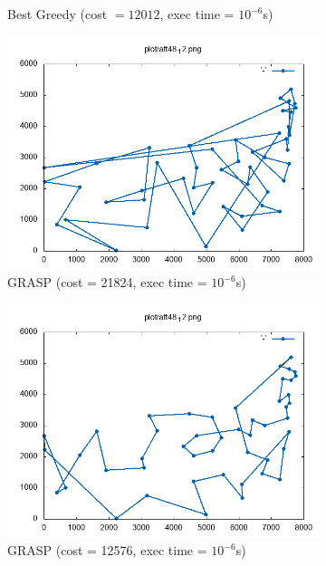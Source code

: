 \begin{figure}[!h]
\begin{subfigure}{.5\textwidth}
		\caption{Best Greedy (cost $ = 12012 $, exec time = $ 10^{-6} $s)}
		\label{fig:att48_GREEDY}
	\end{subfigure}
	\begin{subfigure}{.5\textwidth}
	\centering
	\includegraphics[width=\columnwidth]{../res/att48_12_1.png}
	\caption{GRASP (cost = 21824, exec time = $ 10^{-6} $s)}
	\label{fig:att48_GRASP1}
	\end{subfigure}
	\begin{subfigure}{.5\textwidth}
	\centering
	\includegraphics[width=\columnwidth]{../res/att48_12_2.png}
	\caption{GRASP (cost = 12576, exec time = $ 10^{-6} $s)}
	\label{fig:att48_GRASP2}
	\end{subfigure}
	\begin{subfigure}{.5\textwidth}

\end{subfigure}
\end{figure}
